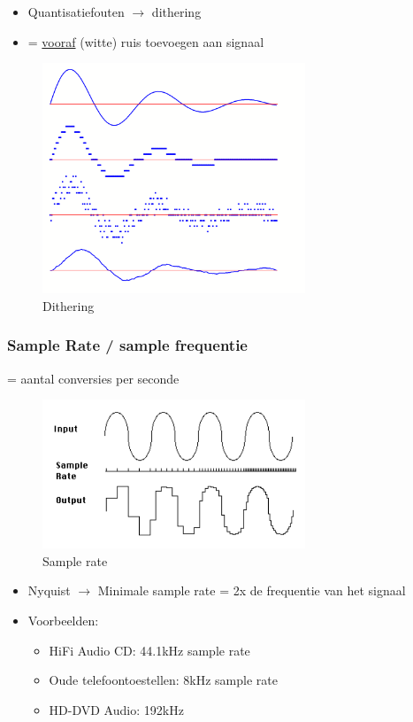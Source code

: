 \documentclass{article}
\begin{document}
\begin{itemize}
    \item Quantisatiefouten $\rightarrow$ dithering
    \item = \underline{vooraf} (witte) ruis toevoegen aan signaal
\end{itemize}

\begin{figure}[H]
    \centering
    \includegraphics[width=0.7\textwidth]{Screenshot_20200224_121151.png}
    \caption{Dithering}
\end{figure}

\subsubsection{Sample Rate / sample frequentie}
= aantal conversies per seconde
\begin{figure}[H]
    \centering
    \includegraphics[width=0.7\textwidth]{Screenshot_20200224_121653.png}
    \caption{Sample rate}
\end{figure}

\begin{itemize}
    \item Nyquist $\rightarrow$ Minimale sample rate = 2x de frequentie van het signaal
    \item Voorbeelden:
    \begin{itemize}
        \item HiFi Audio CD: 44.1kHz sample rate
        \item Oude telefoontoestellen: 8kHz sample rate
        \item HD-DVD Audio: 192kHz
    \end{itemize}
\end{itemize}
\end{document}
